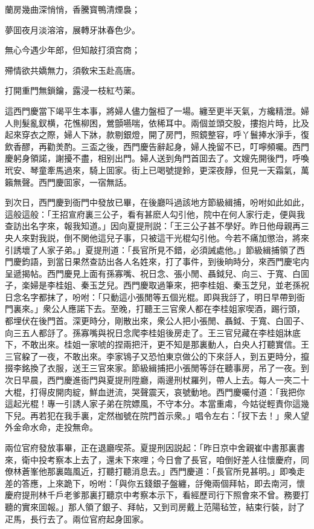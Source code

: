 \begin{myquote}
蘭房幾曲深悄悄，香騰寳鴨清煙裊；

夢囬夜月淡溶溶，展轉牙牀春色少。

無心今遇少年郎，但知敲打須宫商；

殢情欲共嬌無力，須敎宋玉赴高唐。

打開重門無鎖鑰，露浸一枝紅芍薬。
\end{myquote}

這西門慶當下竭平生本事，將婦人儘力盤桓了一場。纏至更半天氣，方纔精泄。婦人則髮亂釵横，花憔柳困，鶯顫嚥喘，依稀耳中。兩個並頭交股，摟抱片時，比及起來穿衣之際，婦人下牀，款剔銀燈，開了房門，照鏡整容，呼丫鬟捧水淨手，復飲香醪，再勸羙酌。三盃之後，西門慶告辭起身，婦人挽留不已，叮嚀頻囑。西門慶躬身領諾，謝擾不盡，相别出門。婦人送到角門首囬去了。文嫂先開後門，呼喚玳安、琴童牽馬過來，騎上囬家。街上已喝號提鈴，更深夜靜，但見一天霜氣，萬籟無聲。西門慶囬家，一宿無話。

到次日，西門慶到衙門中發放已畢，在後廳呌過該地方節級緝捕，吩咐如此如此，這般這般：「王招宣府裏三公子，看有甚麽人勾引他，院中在何人家行走，便與我查訪出名字來，報我知道。」因向夏提刑説：「王三公子甚不學好。昨日他母親再三央人來對我説，倒不関他這兒子事，只被這干光棍勾引他。今若不痛加懲治，將來引誘壞了人家子弟。」夏提刑道：「長官所見不錯，必須誡處他。」節級緝捕領了西門慶鈞語，到當日果然查訪出各人名姓來，打了事件，到後晌時分，來西門慶宅内呈遞揭帖。西門慶見上面有孫寡嘴、祝日念、張小閒、聶鉞兒、向三、于寬、白囬子，楽婦是李桂姐、秦玉芝兒。西門慶取過筆來，把李桂姐、秦玉芝兒，並老孫祝日念名字都抹了，吩咐：「只動這小張閒等五個光棍。即與我㧱了，明日早帶到衙門裏來。」衆公人應諾下去。至晚，打聽王三官衆人都在李桂姐家喫酒，踢行頭，都埋伏在後門首。深更時分，剛散出來，衆公人把小張閒、聶鉞、于寬、白囬子、向三五人都㧱了。孫寡嘴與祝日念爬李桂姐後房走了。王三官兒藏在李桂姐牀底下，不敢出來。桂姐一家唬的捏兩把汗，更不知是那裏動人，白央人打聽實信。王三官躱了一夜，不敢出來。李家鴇子又恐怕東京做公的下來㧱人，到五更時分，攛掇李銘換了衣服，送王三官來家。節級緝捕把小張閒等㧱在聽事房，吊了一夜。到次日早晨，西門慶進衙門與夏提刑陞廳，兩邊刑杖羅列，帶人上去。每人一夾二十大棍，打得皮開肉綻，鮮血迸流，哭聲震天，哀號動地。西門慶囑付道：「我把你這起光棍！專一引誘人家子弟在院嫖風，不守本分。本當重䖏，今姑従輕責你這幾下兒。再若犯在我手裏，定然枷號在院門首示衆。」唱令左右：「扠下去！」衆人望外金命水命，走投無命。

兩位官府發放事畢，正在退廳喫茶。夏提刑因説起：「昨日京中舍親崔中書那裏書來，衛中投考察本上去了，還未下來哩；今日會了長官，咱倒好差人往懷慶府，同僚林蒼峯他那裏臨風近，打聽打聽消息去。」西門慶道：「長官所見甚明。」即喚走差的答應，上來跪下，吩咐：「與你五錢銀子盤纏，㧱俺兩個拜帖，即去南河，懷慶府提刑林千戶老爹那裏打聽京中考察本示下，看經歷司行下照會來不曾。務要打聽的實來囬報。」那人領了銀子、拜帖，又到司房戴上范陽毡笠，結束行裝，討了疋馬，長行去了。兩位官府起身囬家。


